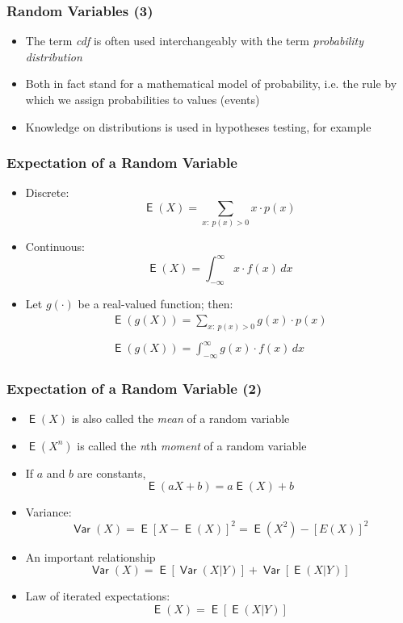 \documentclass[10pt]{beamer}
\DeclareMathOperator{\E}{\mathsf{E}}
\DeclareMathOperator{\var}{\mathsf{Var}}
\theoremstyle{definition}
\begin{document}
\begin{frame}[fragile]
\frametitle{Random Variables (3)}
\begin{itemize}
	\item The term \textit{cdf} is often used interchangeably with the term \textit{probability distribution}
		
	\item Both in fact stand for a mathematical model of probability, i.e. the rule by which we assign probabilities to values (events)
		
	\item Knowledge on distributions is used in hypotheses testing, for example
\end{itemize}
\end{frame}

\begin{frame}[fragile]
\frametitle{Expectation of a Random Variable}
\begin{itemize}
	\item Discrete:
	\[
		\E(X) = \sum_{x:\ p(x) > 0} x\cdot p(x)
	\]
		
	\item Continuous:
	\[
		\E(X) = \int_{-\infty}^{\infty} x\cdot f(x) \, dx
	\]
		
	\item Let $ g(\cdot) $ be a real-valued function; then:
	\[
		\begin{array}{lcl}
			\displaystyle \E(g(X)) = \sum_{x:\ p(x) > 0} g(x)\cdot p(x)\\
			\quad\\
			\displaystyle \E(g(X)) = \int_{-\infty}^{\infty} g(x)\cdot f(x) \, dx
		\end{array}
	\]
\end{itemize}
\end{frame}

\begin{frame}[fragile]
\frametitle{Expectation of a Random Variable (2)}
\begin{itemize}
	\item $ \E(X) $ is also called the \textit{mean} of a random variable
		
	\item $ \E(X^{n}) $ is called the \textit{n}th \textit{moment} of a random variable
		
	\item If $ a $ and $ b $ are constants,
	\[
		\E(aX + b) = a\E(X) + b
	\]
		
	\item Variance:
	\[
		\var(X)  = \E[X - \E(X)]^{2} = \E(X^{2}) - [E(X)]^{2}
	\]
	
	\item An important relationship
	\[
		\var(X) = \E[\var(X|Y)] + \var[\E(X|Y)]
	\]
	
	\item Law of iterated expectations:
	\[
		\E(X) = \E[\E(X|Y)]
	\]
\end{itemize}
\end{frame}
\end{document}
